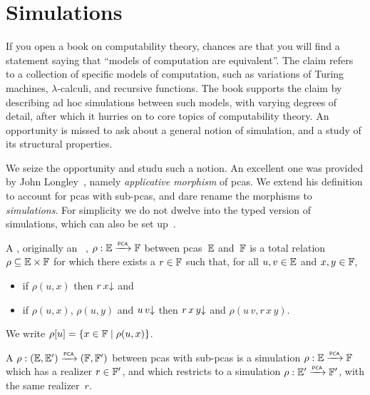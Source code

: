 \section{Simulations}
\label{sec:simulations}%

If you open a book on computability theory, chances are that you will find a statement saying that ``models of computation are equivalent''. The claim refers to a collection of specific models of computation, such as variations of Turing machines, $\lambda$-calculi, and recursive functions. The book supports the claim by describing ad hoc simulations between such models, with varying degrees of detail, after which it hurries on to core topics of computability theory. An opportunity is missed to ask about a general notion of simulation, and a study of its structural properties.


We seize the opportunity and studu such a notion. An excellent one was provided by John Longley~, namely \emph{applicative morphism} of pcas. We extend his definition to account for pcas with sub-pcas, and dare rename the morphisms to \emph{simulations}. For simplicity we do not dwelve into the typed version of simulations, which can also be set up~\cite{longley99:_match}.

\begin{definition}
  \label{def:simulation}%
  A , originally an ~\cite{Longley:94},
  $\rho: {\mathbb{E}} \xrightarrow{\scriptscriptstyle\mathsf{PCA}}{} {\mathbb{F}}$ between pcas~${\mathbb{E}}$ and~${\mathbb{F}}$ is a total relation $\rho
  \subseteq {\mathbb{E}} \times {\mathbb{F}}$ for which there exists a  $r \in {\mathbb{F}}$
  such that, for all $u, v \in {\mathbb{E}}$ and $x, y \in {\mathbb{F}}$,
  \begin{itemize}
  \item if $\rho(u, x)$ then $r \, x{\downarrow}$ and
  \item if $\rho(u, x)$, $\rho(u, y)$ and $u \, v{\downarrow}$ then
    $r \, x \, y{\downarrow}$ and $\rho(u \, v, r \, x \, y)$.
  \end{itemize}
  We write $\rho[u] = \{x \in {\mathbb{F}} \mid \rho(u, x)\}$.

  A  $\rho: ({\mathbb{E}}, {\mathbb{E}'}) \xrightarrow{\scriptscriptstyle\mathsf{PCA}}{} ({\mathbb{F}}, {\mathbb{F}'})$ between pcas with sub-pcas is a simulation
  $\rho : {\mathbb{E}} \xrightarrow{\scriptscriptstyle\mathsf{PCA}}{} {\mathbb{F}}$ which has a realizer $r \in {\mathbb{F}'}$, and which restricts to a simulation
  $\rho : {\mathbb{E}'} \xrightarrow{\scriptscriptstyle\mathsf{PCA}}{} {\mathbb{F}'}$, with the same realizer~$r$.
\end{definition}

